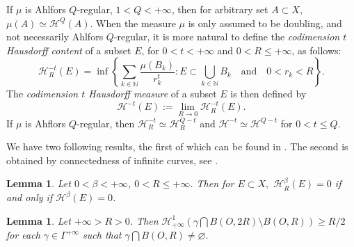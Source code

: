 \documentclass[10pt]{amsart}
\newtheorem{lemma}[theorem]{Lemma}
\numberwithin{equation}{section}
\newcommand{\N}{\mathbb{N}}
\newcommand{\Ha}{\mathcal{H}}
\newcommand{\diam}{\text{\rm diam}}
\newcommand{\rad}{\text{\rm rad}}
\begin{document}
   If $\mu$ is Ahlfors $Q$-regular, $1<Q<+\infty$, then for arbitrary set $A\subset X$, $\mu(A)\simeq \mathcal H^Q(A)$.
   When the measure $\mu$ is only assumed to be doubling, and not necessarily Ahlfors $Q$-regular, it is more natural to define the  \emph{codimension $t$ Hausdorff content} of a subset $E$, for $0< t<+\infty$ and $0<R\le+\infty$, as follows:
   \[
   \Ha^{-t}_R(E)=\inf\left\{\sum_{k\in\N}\frac{\mu(B_k)}{r_k^t}:E\subset\bigcup_{k\in\N}B_k\quad\text{and}\quad 0<r_k<R\right\}.
   \]
   The \emph{codimension $t$ Hausdorff measure} of a subset $E$ is then defined by 
   \[
   \Ha^{-t}(E):=\lim_{R\to 0}\Ha^{-t}_R(E).
   \]
   If $\mu$ is  Ahflors $Q$-regular, then $\Ha^{-t}_R\simeq\Ha^{Q-t}_R$ and $\Ha^{-t}\simeq\Ha^{Q-t}$ for $0< t\le Q$.
   
	We have two following results, the first of which can be found in  \cite[Lemma 2.25]{HKM06}.  The second is obtained by connectedness of infinite curves, see \cite[Corollary 2.10.12]{Fe69}.
	\begin{lemma}\label{lem2.1-0805}
		Let $0<\beta<{+\infty}$, $0<R\leq {+\infty}$. Then for $E\subset X,$ $\mathcal H^{\beta}_{R}(E)=0$ if and only if  $\mathcal H^{\beta}(E)=0$.
	\end{lemma}
 
\begin{lemma}\label{lem2.3-0505}
 	Let $+\infty>R>0$. Then	
 		$\mathcal H^1_{+\infty}(\gamma\bigcap B(O,2R)\setminus B(O,R))\geq R/2$ for each $\gamma\in\Gamma^{+\infty}$ such that $\gamma\bigcap B(O,R)\ne\varnothing$.
 	\end{lemma}
 
   
\end{document}
